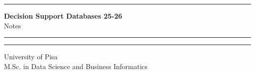 \documentclass[12pt]{report}
\begin{document}
\begin{titlepage}
    \hrule
    \vspace{15pt}
    \begin{center}
        \Huge{\textbf{\Huge \textbf{Decision Support Databases 25-26}} \\ Notes}\\
    \end{center}
    \vspace{15pt}
    \hrule
    \vfill
    \hrule
    \begin{center}
        \Large University of Pisa \\ M.Sc. in Data Science and Business Informatics
    \end{center}
\end{titlepage}

\tableofcontents









\nocite{*}

\clearpage
\end{document}
